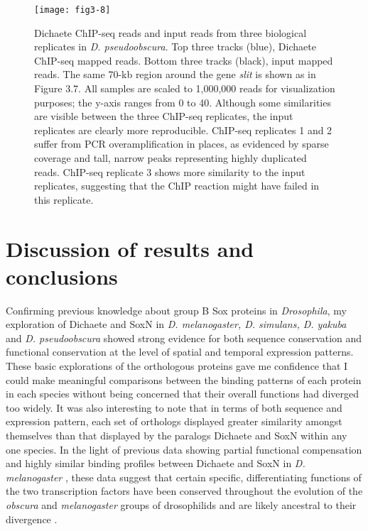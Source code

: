\begin{figure}
\centering
\texttt{[image: fig3-8]}
\caption[Dichaete ChIP-seq reads and input reads from three biological replicates in \emph{D. pseudoobscura}]{Dichaete ChIP-seq reads and input reads from three biological replicates in \emph{D. pseudoobscura}. Top three tracks (blue), Dichaete ChIP-seq mapped reads. Bottom three tracks (black), input mapped reads. The same 70-kb region around the gene \emph{slit} is shown as in Figure 3.7. All samples are scaled to 1,000,000 reads for visualization purposes; the y-axis ranges from 0 to 40. Although some similarities are visible between the three ChIP-seq replicates, the input replicates are clearly more reproducible. ChIP-seq replicates 1 and 2 suffer from PCR overamplification in places, as evidenced by sparse coverage and tall, narrow peaks representing highly duplicated reads. ChIP-seq replicate 3 shows more similarity to the input replicates, suggesting that the ChIP reaction might have failed in this replicate.}
\label{Figure 3.8}
\end{figure}

\section{Discussion of results and conclusions}
Confirming previous knowledge about group B Sox proteins in \emph{Drosophila}, my exploration of Dichaete and SoxN in \emph{D. melanogaster, D. simulans, D. yakuba} and \emph{D. pseudoobscura} showed strong evidence for both sequence conservation and functional conservation at the level of spatial and temporal expression patterns. These basic explorations of the orthologous proteins gave me confidence that I could make meaningful comparisons between the binding patterns of each protein in each species without being concerned that their overall functions had diverged too widely. It was also interesting to note that in terms of both sequence and expression pattern, each set of orthologs displayed greater similarity amongst themselves than that displayed by the paralogs Dichaete and SoxN within any one species. In the light of previous data showing partial functional compensation and highly similar binding profiles between Dichaete and SoxN in \emph{D. melanogaster} \citep{ferrero_soxneuro_2014,overton_drosophila_2007}, these data suggest that certain specific, differentiating functions of the two transcription factors have been conserved throughout the evolution of the \emph{obscura} and \emph{melanogaster} groups of drosophilids and are likely ancestral to their divergence \citep{russo_molecular_1995}.

